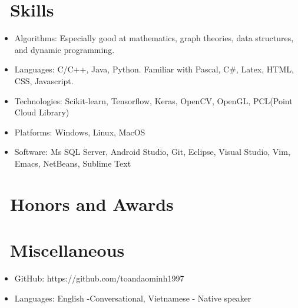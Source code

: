 \documentclass{resume}
\begin{document}

\section{\faCogs\ Skills}
\begin{itemize}[parsep=0.5ex]
  \item Algorithms: Especially good at mathematics, graph theories, data structures, and dynamic programming.
  \item Languages: C/C++, Java, Python. Familiar with Pascal, C#, Latex, HTML, CSS, Javascript.
  \item Technologies: Scikit-learn, Tensorflow, Keras, OpenCV, OpenGL, PCL(Point Cloud Library)
  \item Platforms: Windows, Linux, MacOS
  \item Software: Ms SQL Server, Android Studio, Git, Eclipse, Visual Studio, Vim, Emacs, NetBeans, Sublime Text


\end{itemize}

\section{\faHeartO\ Honors and Awards}


\section{\faInfo\ Miscellaneous}
\begin{itemize}[parsep=0.5ex]
  \item GitHub: https://github.com/toandaominh1997
  \item Languages: English -Conversational, Vietnamese - Native speaker
\end{itemize}

%
%
\end{document}
